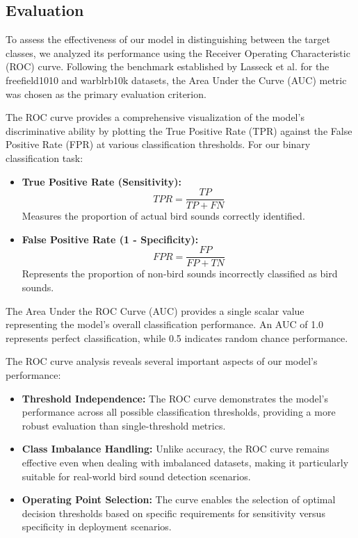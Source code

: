       \newpage   
      \subsection{Evaluation}
      To assess the effectiveness of our model in distinguishing between the target classes, we analyzed its performance using the Receiver Operating Characteristic (ROC) curve. Following the benchmark established by Lasseck et al.\cite{lasseck2018acoustic} for the freefield1010 and warblrb10k datasets, the Area Under the Curve (AUC) metric was chosen as the primary evaluation criterion.

      The ROC curve provides a comprehensive visualization of the model's discriminative ability by plotting the True Positive Rate (TPR) against the False Positive Rate (FPR) at various classification thresholds. For our binary classification task:

      \begin{itemize}
      \item \textbf{True Positive Rate (Sensitivity):}
      \begin{equation}
            TPR = \frac{TP}{TP + FN}
      \end{equation}
      Measures the proportion of actual bird sounds correctly identified.

      \item \textbf{False Positive Rate (1 - Specificity):}
      \begin{equation}
            FPR = \frac{FP}{FP + TN}
      \end{equation}
      Represents the proportion of non-bird sounds incorrectly classified as bird sounds.
      \end{itemize}
      The Area Under the ROC Curve (AUC) provides a single scalar value representing the model's overall classification performance. An AUC of 1.0 represents perfect classification, while 0.5 indicates random chance performance.

      The ROC curve analysis reveals several important aspects of our model's performance:

      \begin{itemize}
      \item \textbf{Threshold Independence:} The ROC curve demonstrates the model's performance across all possible classification thresholds, providing a more robust evaluation than single-threshold metrics.
      
      \item \textbf{Class Imbalance Handling:} Unlike accuracy, the ROC curve remains effective even when dealing with imbalanced datasets, making it particularly suitable for real-world bird sound detection scenarios.
      
      \item \textbf{Operating Point Selection:} The curve enables the selection of optimal decision thresholds based on specific requirements for sensitivity versus specificity in deployment scenarios.
      \end{itemize}

